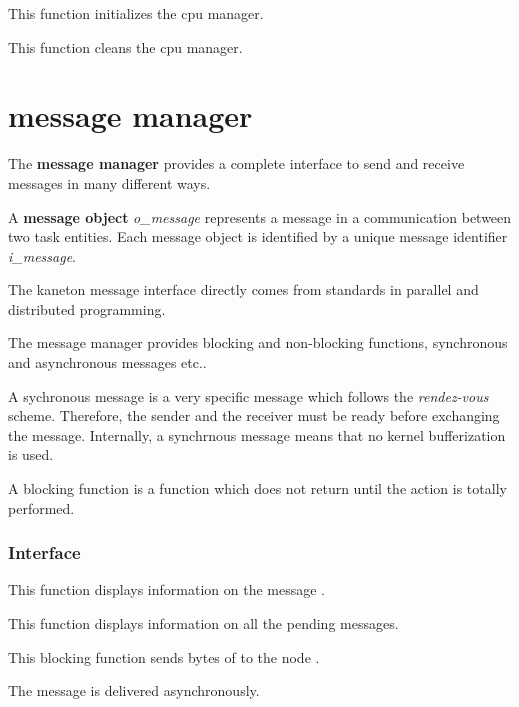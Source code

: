 	 {
	   This function initializes the cpu manager.
	 }

	 {
	   This function cleans the cpu manager.
	 }


%
%

\section{message manager}

The \textbf{message manager} provides a complete interface to send and
receive messages in many different ways.

A \textbf{message object} \textit{o\_message} represents a message in a
communication between two task entities. Each message object is identified
by a unique message identifier \textit{i\_message}.

The kaneton message interface directly comes from standards in parallel
and distributed programming.

The message manager provides blocking and non-blocking functions,
synchronous and asynchronous messages etc..

A sychronous message is a very specific message which follows the
\textit{rendez-vous} scheme. Therefore, the sender and the receiver
must be ready before exchanging the message. Internally, a synchrnous
message means that no kernel bufferization is used.

A blocking function is a function which does not return until the
action is totally performed.

%
%

\subsubsection{Interface}

	 {
	   This function displays information on the message .
	 }

	 {
	   This function displays information on all the pending messages.
	 }

	 {
	   This blocking function sends  bytes of
	    to the node .

	   The message is delivered asynchronously.
	 }

